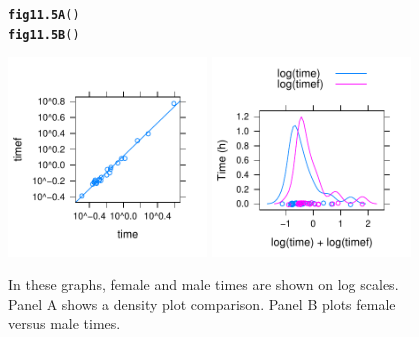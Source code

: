 \documentclass[12pt, a4paper,  BCOR=8.25mm, DIV=15]{scrartcl}\usepackage[]{graphicx}\usepackage[]{color}
\makeatletter
\newcommand{\hlstd}[1]{\textcolor[rgb]{0.345,0.345,0.345}{#1}}%
\newcommand{\hlkwd}[1]{\textcolor[rgb]{0.737,0.353,0.396}{\textbf{#1}}}%
\newenvironment{kframe}{%
 \def\at@end@of@kframe{}%
 \ifinner\ifhmode%
  \def\at@end@of@kframe{\end{minipage}}%
  \begin{minipage}{\columnwidth}%
 \fi\fi%
 \def\FrameCommand##1{\hskip\@totalleftmargin \hskip-\fboxsep
 \colorbox{shadecolor}{##1}\hskip-\fboxsep
     \hskip-\linewidth \hskip-\@totalleftmargin \hskip\columnwidth}%
 \MakeFramed {\advance\hsize-\width
   \@totalleftmargin\z@ \linewidth\hsize
   \@setminipage}}%
 {\par\unskip\endMakeFramed%
 \at@end@of@kframe}
\newenvironment{knitrout}{}{} %
\makeatother
\begin{document}
\begin{figure}[H]
\begin{knitrout}
\color{fgcolor}\begin{kframe}
\begin{alltt}
\hlkwd{fig11.5A}\hlstd{()}
\hlkwd{fig11.5B}\hlstd{()}
\end{alltt}
\end{kframe}

{\centering \includegraphics[width=0.47\textwidth]{figs/reg-mVSfTime-11_5-1} 
\includegraphics[width=0.47\textwidth]{figs/reg-mVSfTime-11_5-2} 

}



\end{knitrout}
  \caption{In these graphs, female and male times are shown on log scales.
    Panel A shows a density plot comparison. Panel B plots female versus
    male times.
  }\label{fig:skewtime-log}
\end{figure}
\end{document}
